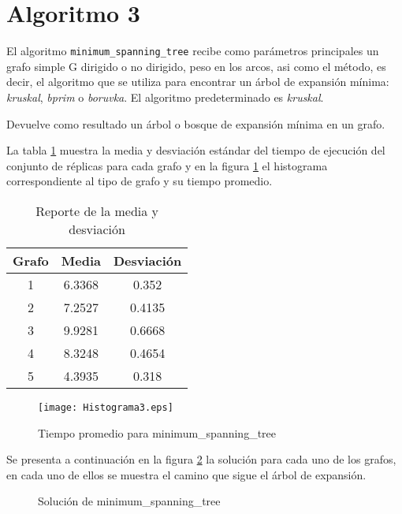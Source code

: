 \documentclass{article}
\begin{document}
\newpage
\section*{Algoritmo 3}
El algoritmo \texttt{minimum\_spanning\_tree} recibe como parámetros principales un grafo simple G dirigido o no dirigido, peso en los arcos, asi como el método, es decir, el algoritmo que se utiliza para encontrar un árbol de expansión mínima: \textit{kruskal}, \textit{bprim} o \textit{boruvka}. El algoritmo predeterminado es \textit{kruskal}.

Devuelve como resultado un árbol o bosque de expansión mínima en un grafo. 

La tabla \ref{Tabla3} muestra la media y desviación estándar del tiempo de ejecución del conjunto de réplicas para cada grafo y en la figura \ref{Figura3} el histograma correspondiente al tipo de grafo y su tiempo promedio.

\begin{table}[h]
\centering
\begin{tabular}{|c|c|c|}
\hline
\textbf{Grafo} & \textbf{Media} & \textbf{Desviación} \\ \hline
1              & 6.3368         & 0.352               \\ \hline
2              & 7.2527         & 0.4135              \\ \hline
3              & 9.9281         & 0.6668              \\ \hline
4              & 8.3248         & 0.4654              \\ \hline
5              & 4.3935         & 0.318               \\ \hline
\end{tabular}
\caption{Reporte de la media y desviación} 
\label{Tabla3}
\end{table}

\begin{figure}[h]
\centering
\texttt{[image: Histograma3.eps]}  
\caption{Tiempo promedio para minimum\_spanning\_tree}
\label{Figura3}
\end{figure}

Se presenta a continuación en la figura \ref{Grafos3} la solución para cada uno de los grafos, en cada uno de ellos se muestra el camino que sigue el árbol de expansión.



\begin{figure}[H]
\centering
{}\hspace{5mm}
\vspace{5mm}
\hspace{5mm}
\vspace{5mm}
\caption{Solución de minimum\_spanning\_tree} \label{Grafos3}
\end{figure}
\end{document}
